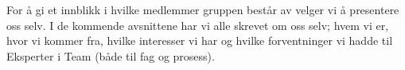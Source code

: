 For å gi et innblikk i hvilke medlemmer gruppen består av velger vi å presentere oss selv.
I de kommende avsnittene har vi alle skrevet om oss selv; hvem vi er, hvor vi kommer fra, hvilke interesser vi har og hvilke forventninger vi hadde til Eksperter i Team (både til fag og prosess).
\\